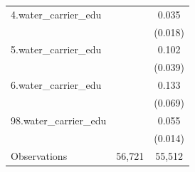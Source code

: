 \begin{table}[htbp]
\begin{tabular}{l cc}
4.water\_carrier\_edu&                     &       0.035\sym{**} \\
            &                     &     (0.018)         \\
\addlinespace
5.water\_carrier\_edu&                     &       0.102\sym{***}\\
            &                     &     (0.039)         \\
\addlinespace
6.water\_carrier\_edu&                     &       0.133\sym{*}  \\
            &                     &     (0.069)         \\
\addlinespace
98.water\_carrier\_edu&                     &       0.055\sym{***}\\
            &                     &     (0.014)         \\
\midrule
Observations&      56,721         &      55,512         \\
\bottomrule\end{tabular}\end{table}
